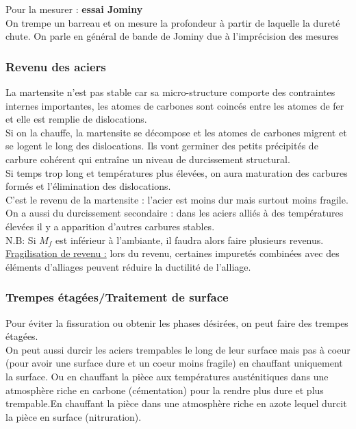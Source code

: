 \documentclass[../main.tex]{subfiles}
\begin{document}
Pour la mesurer : \textbf{essai Jominy}\\
On trempe un barreau et on mesure la profondeur à partir de laquelle la dureté chute. \color{gray} On parle en général de bande de Jominy due à l'imprécision des mesures\color{black}\\

\subsubsection{Revenu des aciers}
La martensite n'est pas stable car sa micro-structure comporte des contraintes internes importantes, les atomes de carbones sont coincés entre les atomes de fer et elle est remplie de dislocations.\\
Si on la chauffe, la martensite se décompose et les atomes de carbones migrent et se logent le long des dislocations. Ils vont germiner des petits précipités de carbure cohérent qui entraîne un niveau de durcissement structural.\\
Si temps trop long et températures plus élevées, on aura maturation des carbures formés et l'élimination des dislocations.\\
C'est le revenu de la martensite : l'acier est moins dur mais surtout moins fragile.\\

On a aussi du durcissement secondaire : dans les aciers alliés à des températures élevées il y a apparition d'autres carbures stables.\\

N.B: Si $M_f$ est inférieur à l'ambiante, il faudra alors faire plusieurs revenus.\\

\quad \underline{Fragilisation de revenu :} lors du revenu, certaines impuretés combinées avec des éléments d'alliages peuvent réduire la ductilité de l'alliage.\\

\subsubsection{Trempes étagées/Traitement de surface}
Pour éviter la fissuration ou obtenir les phases désirées, on peut faire des trempes étagées.\\
On peut aussi durcir les aciers trempables le long de leur surface mais pas à coeur (pour avoir une surface dure et un coeur moins fragile) en chauffant uniquement la surface. Ou en chauffant la pièce aux températures austénitiques dans une atmosphère riche en carbone (cémentation) pour la rendre plus dure et plus trempable.En chauffant la pièce dans une atmosphère riche en azote lequel durcit la pièce en surface (nitruration).\\
\end{document}
